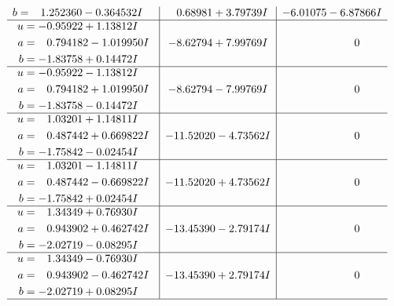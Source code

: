\documentclass[1p]{elsarticle_modified}
\theoremstyle{definition}
\begin{document}
$$\begin{array}{c|c|c}
\begin{aligned}
b &= \phantom{-}1.252360 - 0.364532 I\end{aligned}
 & \phantom{-}0.68981 + 3.79739 I & -6.01075 - 6.87866 I \\ \hline\begin{aligned}
u &= -0.95922 + 1.13812 I \\
a &= \phantom{-}0.794182 - 1.019950 I \\
b &= -1.83758 + 0.14472 I\end{aligned}
 & -8.62794 + 7.99769 I & \phantom{-0.000000 } 0 \\ \hline\begin{aligned}
u &= -0.95922 - 1.13812 I \\
a &= \phantom{-}0.794182 + 1.019950 I \\
b &= -1.83758 - 0.14472 I\end{aligned}
 & -8.62794 - 7.99769 I & \phantom{-0.000000 } 0 \\ \hline\begin{aligned}
u &= \phantom{-}1.03201 + 1.14811 I \\
a &= \phantom{-}0.487442 + 0.669822 I \\
b &= -1.75842 - 0.02454 I\end{aligned}
 & -11.52020 - 4.73562 I & \phantom{-0.000000 } 0 \\ \hline\begin{aligned}
u &= \phantom{-}1.03201 - 1.14811 I \\
a &= \phantom{-}0.487442 - 0.669822 I \\
b &= -1.75842 + 0.02454 I\end{aligned}
 & -11.52020 + 4.73562 I & \phantom{-0.000000 } 0 \\ \hline\begin{aligned}
u &= \phantom{-}1.34349 + 0.76930 I \\
a &= \phantom{-}0.943902 + 0.462742 I \\
b &= -2.02719 - 0.08295 I\end{aligned}
 & -13.45390 - 2.79174 I & \phantom{-0.000000 } 0 \\ \hline\begin{aligned}
u &= \phantom{-}1.34349 - 0.76930 I \\
a &= \phantom{-}0.943902 - 0.462742 I \\
b &= -2.02719 + 0.08295 I\end{aligned}
 & -13.45390 + 2.79174 I & \phantom{-0.000000 } 0\\
 \hline 
 \end{array}$$\newpage$$\begin{array}{c|c|c}  

\end{array}$$
\end{document}
